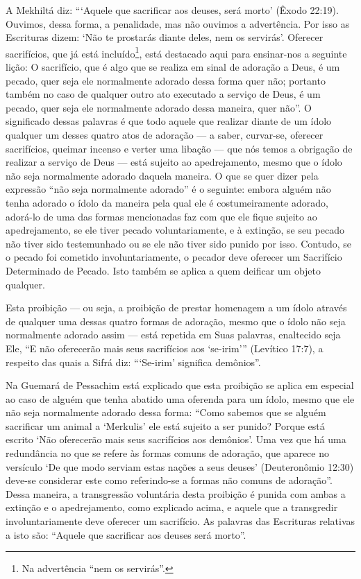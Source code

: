 A Mekhiltá diz: ```Aquele que sacrificar aos deuses, será morto' (Êxodo
22:19). Ouvimos, dessa forma, a penalidade, mas não ouvimos a
advertência. Por isso as Escrituras dizem: `Não te prostarás diante
deles, nem os servirás'.
Oferecer sacrifícios, que já está incluído\footnote{Na advertência ``nem os servirás''.}, está
destacado aqui para ensinar-nos a seguinte lição: O sacrifício, que é
algo que se realiza em sinal de adoração a Deus, é um pecado, quer seja
ele normalmente adorado dessa forma quer não; portanto também no caso de
qualquer outro ato executado a serviço de Deus, é um pecado, quer seja
ele normalmente adorado dessa maneira, quer não''. O significado dessas
palavras é que todo aquele que realizar diante de um ídolo qualquer um
desses quatro atos de adoração --- a saber, curvar-se, oferecer
sacrifícios, queimar incenso e verter uma libação --- que nós temos a
obrigação de realizar a serviço de Deus --- está sujeito ao
apedrejamento, mesmo que o ídolo não seja normalmente adorado daquela
maneira. O que se quer dizer pela expressão ``não seja normalmente
adorado'' é o seguinte: embora alguém não tenha adorado o ídolo da
maneira pela qual ele é costumeiramente adorado, adorá-lo de uma das
formas mencionadas faz com que ele fique sujeito ao apedrejamento, se
ele tiver pecado voluntariamente, e à extinção, se seu pecado não tiver
sido testemunhado ou se ele não tiver sido punido por isso. Contudo, se
o pecado foi cometido involuntariamente, o pecador deve oferecer um
Sacrifício Determinado de Pecado. Isto também se aplica a quem deificar
um objeto qualquer.

Esta proibição --- ou seja, a proibição de prestar homenagem a um ídolo
através de qualquer uma dessas quatro formas de adoração, mesmo que o
ídolo não seja normalmente adorado assim --- está repetida em Suas
palavras, enaltecido seja Ele, ``E não oferecerão mais seus sacrifícios
aos `se-irim''' (Levítico 17:7), a respeito das quais a Sifrá diz:
```Se-irim' significa demônios''.

Na Guemará de Pessachim está explicado que esta proibição se aplica em
especial ao caso de alguém que tenha abatido uma oferenda para um ídolo,
mesmo que ele não seja normalmente adorado dessa forma: ``Como sabemos
que se alguém sacrificar um animal a `Merkulis' ele está sujeito a ser
punido? Porque está escrito `Não oferecerão mais seus sacrifícios aos
demônios'. Uma vez que há uma redundância no que se refere às formas
comuns de adoração, que aparece no versículo `De que modo serviam estas
nações a seus deuses' (Deuteronômio 12:30) deve-se considerar este como
referindo-se a formas não comuns de adoração''. Dessa maneira, a
transgressão voluntária desta proibição é punida com ambas a extinção e
o apedrejamento, como explicado acima, e aquele que a transgredir
involuntariamente deve oferecer um sacrifício. As palavras das
Escrituras relativas a isto são: ``Aquele que sacrificar aos deuses será
morto''.

